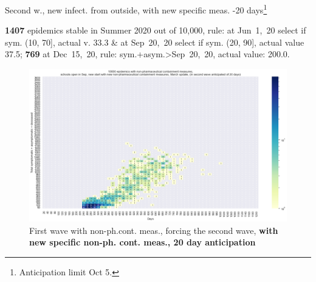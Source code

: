 \documentclass[8pt]{beamer}
\begin{document}
\begin{frame}{Second w., new infect. from outside, with new specific meas. -20 days\footnote{Anticipation limit Oct 5.}}


\textbf{1407} {\tiny epidemics stable in Summer 2020 out of 10,000, rule: at Jun~1,~20 select if sym. (10, 70], actual v. 33.3 \& at Sep~20,~20 select if sym. (20, 90], actual value 37.5;} \textbf{769} {\tiny at Dec~15,~20, rule: sym.+asym.>Sep~20,~20, actual value: 200.0.}

\begin{figure}[H]
\center
\includegraphics[scale=0.17]{10kForceWave2Contr2M-20.png}
\caption{First wave with non-ph.cont. meas., forcing the second wave, \textbf{with new specific non-ph. cont. meas., 20 day anticipation}}
\label{selForceWave2Contr2M-20}
\end{figure}



\end{frame}
\end{document}
